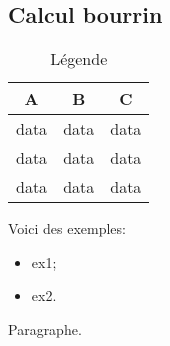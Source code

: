 

\clearpage
\appendixpage
\addappheadtotoc
{}
\renewcommand{\thesubsection}{\textcolor{couleurSubsection}{\Alph{subsection}}} %


\subsection{Calcul bourrin}

    \begin{table}[!htb]
        \centering \begin{tabular}{|ccc|}
            \hline
            A & B & C \\
            \hline
            data & data & data \\
            data & data & data \\
            data & data & data \\
            \hline
        \end{tabular}
        \caption{Légende}
        \label{etiquette3}
    \end{table}

    Voici des exemples:
    \begin{itemize}
        \item ex1;
        \item ex2.
    \end{itemize}

    \vspace*{1ex}
    Paragraphe.
    
    